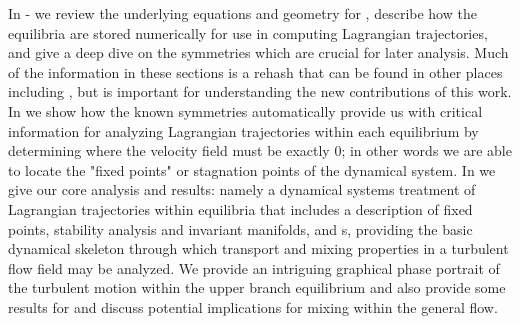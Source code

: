 In - we review the underlying equations 
and geometry for {\pCf}, describe how the equilibria are stored 
numerically for use in computing Lagrangian trajectories, and give a deep 
dive on the symmetries which are crucial for later analysis. Much of the 
information in these sections is a rehash that can be found in other 
places including \citet{GHCW07}, but is important for understanding the 
new contributions of this work.  In  we show how 
the known symmetries automatically provide us with critical information 
for analyzing Lagrangian trajectories within each equilibrium by 
determining where the velocity field must be exactly 0; in other words we 
are able to locate the "fixed points" or stagnation points of the dynamical system. In  we give our core 
analysis and results: namely a dynamical systems treatment of Lagrangian 
trajectories within {\pC} equilibria that includes a description of 
fixed points, stability analysis and invariant manifolds, and {\hc}s, 
providing the basic dynamical skeleton through which transport and mixing 
properties in a turbulent flow field may be analyzed. We provide an 
intriguing graphical phase portrait of the turbulent motion within the 
upper branch equilibrium and also provide some results for {\tEQeight} and 
discuss potential implications for mixing within the general flow.

 

